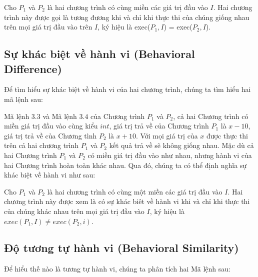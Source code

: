 \begin{definition}
 Cho $P_{1}$ và $P_{2}$ là hai chương trình có cùng miền các giá trị đầu vào $I$. Hai chương trình này được gọi là tương đương khi và chỉ khi thực thi của chúng giống nhau trên mọi giá trị đầu vào trên $I$, ký hiệu là exec($P_{1}, I$) = exec($P_{2}, I$). 
\end{definition}	
	
\subsection{Sự khác biệt về hành vi (Behavioral Difference) }
Để tìm hiểu sự khác biệt về hành vi của hai chương trình, chúng ta tìm hiểu hai mã lệnh sau:

\begin{minipage}[t]{0.45\linewidth}
	
\end{minipage}%
\hfill\vrule\hfill
\begin{minipage}[t]{0.45\linewidth}
	
\end{minipage}%

Mã lệnh $3.3$ và Mã lệnh $3.4$ của Chương trình $P_{1}$ và $P_{2}$, cả hai Chương trình có miền giá trị đầu vào cùng kiểu $int$, giá trị trả về của Chương trình $P_{1}$ là $x - 10$, giá trị trả về của Chương tình $P_{2}$ là $x + 10$. Với mọi giá trị của $x$ được thực thi trên cả hai chương trình $P_{1}$ và $P_{2}$ kết quả trả về sẽ không giống nhau. Mặc dù cả hai Chương trình $P_{1}$ và $P_{2}$ có miền giá trị đầu vào như nhau, nhưng hành vi của hai Chương trình hoàn toàn khác nhau. Qua đó, chúng ta có thể định nghĩa sự khác biệt về hành vi như sau:

\begin{definition}
Cho $P_{1}$ và $P_{2}$ là hai chương trình có cùng một miền các giá trị đầu vào $I$. Hai chương trình này được xem là có sự khác biêt về hành vi khi và chỉ khi thực thi của chúng khác nhau trên mọi giá trị đầu vào $I$, ký hiệu là $exec(P_{1}, I) \neq exec(P_{2}, i)$.
\end{definition}

\subsection{Độ tương tự hành vi (Behavioral Similarity)}
Để hiểu thế nào là tương tự hành vi, chúng ta phân tích hai Mã lệnh sau:

